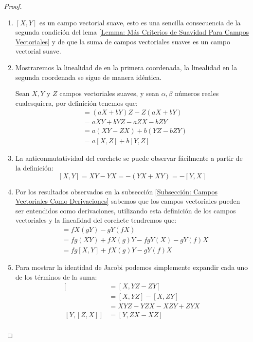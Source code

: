 \begin{proof}
	\phantom{ }
	\begin{enumerate}
		\item $[X,Y]$ es un campo vectorial suave, esto es una sencilla consecuencia de la segunda condición del lema \ref{Lemma: Más Criterios de Suavidad Para Campos Vectoriales} y de que la suma de campos vectoriales suaves es un campo vectorial suave.
		\item Mostraremos la linealidad de en la primera coordenada, la linealidad en la segunda coordenada se sigue de manera idéntica.

		      Sean $X, Y$ y $Z$ campos vectoriales suaves, y sean $\alpha, \beta$ números reales cualesquiera, por definición tenemos que:
		      \begin{align*}
			      [aX + bY, Z] & = (aX + bY)Z  - Z(aX + bY) \\
			                   & = aXY + bYZ - aZX - bZY    \\
			                   & = a(XY - ZX) + b(YZ - bZY) \\
			                   & = a[X,Z] + b[Y,Z]
		      \end{align*}
		\item La anticonmutatividad del corchete se puede observar fácilmente a partir de la definición:
		      \[
			      [X,Y] = XY - YX = -(YX + XY) = -[Y,X]
		      \]
		\item Por los resultados observados en la subsección \ref{Subsección: Campos Vectoriales Como Derivaciones} sabemos que los campos vectoriales pueden ser entendidos como derivaciones, utilizando esta definición de los campos vectoriales y la linealidad del corchete tendremos que:
		      \begin{align*}
			      [fX,gY] & = fX(gY) - gY(fX)                   \\
			              & = fg(XY) + fX(g)Y - fgY(X) - gY(f)X \\
			              & = fg[X,Y] + fX(g)Y - gY(f)X
		      \end{align*}
		\item Para mostrar la identidad de Jacobi podemos simplemente expandir cada uno de los términos de la suma:
		      \begin{align*}
			      [X,[Y,Z]] & = [X,YZ - ZY]           \\
			                & = [X,YZ] - [X,ZY]       \\
			                & = XYZ - YZX - XZY + ZYX \\
			      [Y,[Z,X]] & = [Y,ZX - XZ]           \\

\end{align*}
\end{enumerate}
\end{proof}
